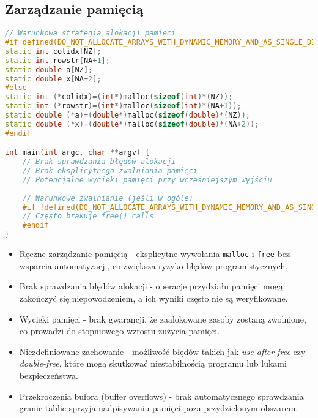 \subsection{Zarządzanie pamięcią}
\begin{lstlisting}[language=C++, caption={Zarządzanie pamięcią w benchmarkach C++ z OpenMP}, label={lst:openmp_memory}]
// Warunkowa strategia alokacji pamięci
#if defined(DO_NOT_ALLOCATE_ARRAYS_WITH_DYNAMIC_MEMORY_AND_AS_SINGLE_DIMENSION)
static int colidx[NZ];
static int rowstr[NA+1];
static double a[NZ];
static double x[NA+2];
#else
static int (*colidx)=(int*)malloc(sizeof(int)*(NZ));
static int (*rowstr)=(int*)malloc(sizeof(int)*(NA+1));
static double (*a)=(double*)malloc(sizeof(double)*(NZ));
static double (*x)=(double*)malloc(sizeof(double)*(NA+2));
#endif

int main(int argc, char **argv) {
    // Brak sprawdzania błędów alokacji
    // Brak eksplicytnego zwalniania pamięci
    // Potencjalne wycieki pamięci przy wcześniejszym wyjściu
    
    // Warunkowe zwalnianie (jeśli w ogóle)
    #if !defined(DO_NOT_ALLOCATE_ARRAYS_WITH_DYNAMIC_MEMORY_AND_AS_SINGLE_DIMENSION)
    // Często brakuje free() calls
    #endif
}
\end{lstlisting}
\begin{itemize}
    \item Ręczne zarządzanie pamięcią - eksplicytne wywołania \texttt{malloc} i \texttt{free} bez wsparcia automatyzacji, co zwiększa ryzyko błędów programistycznych.
    
    \item Brak sprawdzania błędów alokacji - operacje przydziału pamięci mogą zakończyć się niepowodzeniem, a ich wyniki często nie są weryfikowane.
    
    \item Wycieki pamięci - brak gwarancji, że zaalokowane zasoby zostaną zwolnione, co prowadzi do stopniowego wzrostu zużycia pamięci.
    
    \item Niezdefiniowane zachowanie - możliwość błędów takich jak \textit{use-after-free} czy \textit{double-free}, które mogą skutkować niestabilnością programu lub lukami bezpieczeństwa.
    
    \item Przekroczenia bufora (buffer overflows) - brak automatycznego sprawdzania granic tablic sprzyja nadpisywaniu pamięci poza przydzielonym obszarem.
\end{itemize}
  
